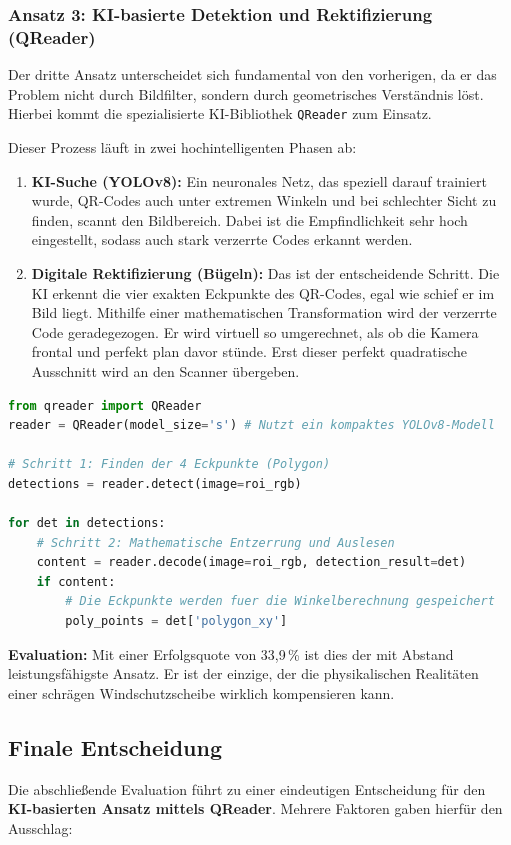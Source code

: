\documentclass[
    a4paper,        %
    11pt,           %
    ngerman,        %
    parskip=half,   %
    listof=totoc,   %
    bibliography=totoc %
]{scrartcl}
\begin{document}
\subsubsection{Ansatz 3: KI-basierte Detektion und Rektifizierung (QReader)}
Der dritte Ansatz unterscheidet sich fundamental von den vorherigen, da er das Problem nicht durch Bildfilter, sondern durch geometrisches Verständnis löst. Hierbei kommt die spezialisierte KI-Bibliothek \texttt{QReader} zum Einsatz.

Dieser Prozess läuft in zwei hochintelligenten Phasen ab:
\begin{enumerate}
    \item \textbf{KI-Suche (YOLOv8):} Ein neuronales Netz, das speziell darauf trainiert wurde, QR-Codes auch unter extremen Winkeln und bei schlechter Sicht zu finden, scannt den Bildbereich. Dabei ist die Empfindlichkeit sehr hoch eingestellt, sodass auch stark verzerrte Codes erkannt werden.
    \item \textbf{Digitale Rektifizierung (\glqq Bügeln\grqq):} Das ist der entscheidende Schritt. Die KI erkennt die vier exakten Eckpunkte des QR-Codes, egal wie schief er im Bild liegt. Mithilfe einer mathematischen Transformation wird der verzerrte Code \glqq geradegezogen\grqq. Er wird virtuell so umgerechnet, als ob die Kamera frontal und perfekt plan davor stünde. Erst dieser perfekt quadratische Ausschnitt wird an den Scanner übergeben.
\end{enumerate}

\begin{lstlisting}[language=Python, caption={KI-gestuetzte Polygon-Extraktion mittels QReader}]
from qreader import QReader
reader = QReader(model_size='s') # Nutzt ein kompaktes YOLOv8-Modell

# Schritt 1: Finden der 4 Eckpunkte (Polygon)
detections = reader.detect(image=roi_rgb) 

for det in detections:
    # Schritt 2: Mathematische Entzerrung und Auslesen
    content = reader.decode(image=roi_rgb, detection_result=det)
    if content:
        # Die Eckpunkte werden fuer die Winkelberechnung gespeichert
        poly_points = det['polygon_xy'] 
\end{lstlisting}

\textbf{Evaluation:} Mit einer Erfolgsquote von 33,9\,\% ist dies der mit Abstand leistungsfähigste Ansatz. Er ist der einzige, der die physikalischen Realitäten einer schrägen Windschutzscheibe wirklich kompensieren kann.

\subsection{Finale Entscheidung}
Die abschließende Evaluation führt zu einer eindeutigen Entscheidung für den \textbf{KI-basierten Ansatz mittels QReader}. Mehrere Faktoren gaben hierfür den Ausschlag:
\end{document}
